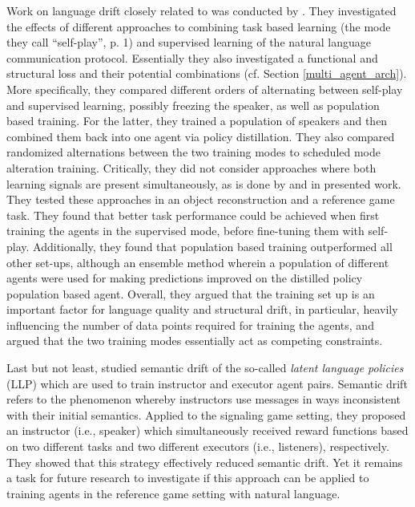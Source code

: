 Work on language drift closely related to \cite{lazaridou2020multi} was conducted by \cite{lowe2020interaction}. They investigated the effects of different approaches to combining task based learning (the mode they call ``self-play'', p. 1) and supervised learning of the natural language communication protocol. Essentially they also investigated a functional and structural loss and their potential combinations (cf. Section \ref{multi_agent_arch}). %
More specifically, they compared different orders of alternating between self-play and supervised learning, possibly freezing the speaker, as well as population based training. For the latter, they trained a population of speakers and then combined them back into one agent via policy distillation. They also compared randomized alternations between the two training modes to scheduled mode alteration training. 
Critically, they did not consider approaches where both learning signals are present simultaneously, as is done by \cite{lazaridou2020multi} and in presented work. They tested these approaches in an object reconstruction and a reference game task.
They found that better task performance could be achieved when first training the agents in the supervised mode, before fine-tuning them with self-play. Additionally, they found that population based training outperformed all other set-ups, although an ensemble method wherein a population of different agents were used for making predictions improved on the distilled policy population based agent. Overall, they argued that the training set up is an important factor for language quality and structural drift, in particular, heavily influencing the number of data points required for training the agents, and argued that the two training modes essentially act as competing constraints.  

Last but not least, \cite{jacob2021multitasking} studied semantic drift of the so-called \textit{latent language policies} (LLP) which are used to train instructor and executor agent pairs. Semantic drift refers to the phenomenon whereby instructors use messages in ways inconsistent with their initial semantics. Applied to the signaling game setting, they proposed an instructor (i.e., speaker) which simultaneously received reward functions based on two different tasks and two different executors (i.e., listeners), respectively. They showed that this strategy effectively reduced semantic drift. Yet it remains a task for future research to investigate if this approach can be applied to training agents in the reference game setting with natural language.

